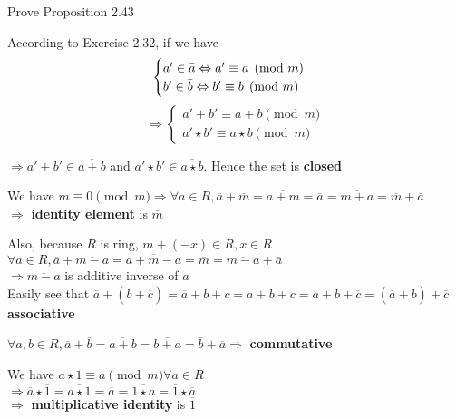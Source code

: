 \begin{exer}[2.33] Prove Proposition 2.43

According to Exercise 2.32, if we have \begin{equation*}
    \begin{cases}
    a' \in \Bar{a} \Leftrightarrow a' \equiv a \pmod m \\ b' \in \Bar{b} \Leftrightarrow b' \equiv b \pmod m
    \end{cases}
\end{equation*} \begin{equation*}
   \Rightarrow \begin{cases}
   a' + b' \equiv a+b \pmod m \\ a' \star b' \equiv a \star b \pmod m
   \end{cases} 
\end{equation*}

$\Rightarrow a'+b' \in \overline{a+b}$ and $a' \star b' \in \overline{a \star b}$. Hence the set is \textbf{closed}

We have $m \equiv 0 \pmod m \Rightarrow \forall a \in R, \overline{a} + \overline{m} = \overline{a+m} = \overline{a} = \overline{m+a} = \overline{m} + \overline{a}$ \\ $\Rightarrow$ \textbf{identity element} is $\overline{m}$

Also, because $R$ is ring, $m+(-x) \in R, x \in R$ \\ $\forall a \in R, \overline{a} + \overline{m-a} = \overline{a + m - a} = \overline{m} = \overline{m-a} + \overline{a}$ \\ $\Rightarrow \overline{m-a}$ is additive inverse of $a$ \\ Easily see that $\overline{a} + (\overline{b}+\overline{c}) = \overline{a} + \overline{b+c} = \overline{a+b+c} = \overline{a+b} + \overline{c} = (\overline{a}+\overline{b})+\overline{c}$ \\ \textbf{associative}

$\forall a, b \in R, \overline{a}+\overline{b}=\overline{a+b}=\overline{b+a}=\overline{b}+\overline{a} \Rightarrow$ \textbf{commutative} 

We have $a \star 1 \equiv a \pmod m \forall a \in R$ \\ $\Rightarrow \overline{a} \star \overline{1} = \overline{a \star 1} = \overline{a} = \overline{1 \star a} = \overline{1} \star \overline{a}$ \\ $\Rightarrow$ \textbf{multiplicative identity} is $\overline{1}$


\end{exer}
